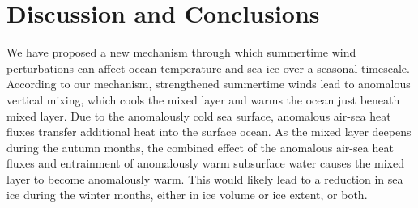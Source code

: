 \documentclass{ametsocV5}
\begin{document}









\section{Discussion and Conclusions} %
\label{sec:discussion}

We have proposed a new mechanism through which summertime wind perturbations can affect ocean temperature and sea ice over a seasonal timescale. According to our mechanism, strengthened summertime winds lead to anomalous vertical mixing, which cools the mixed layer and warms the ocean just beneath mixed layer. Due to the anomalously cold sea surface, anomalous air-sea heat fluxes transfer additional heat into the surface ocean. As the mixed layer deepens during the autumn months, the combined effect of the anomalous air-sea heat fluxes and entrainment of anomalously warm subsurface water causes the mixed layer to become anomalously warm. This would likely lead to a reduction in sea ice during the winter months, either in ice volume or ice extent, or both.
\end{document}
